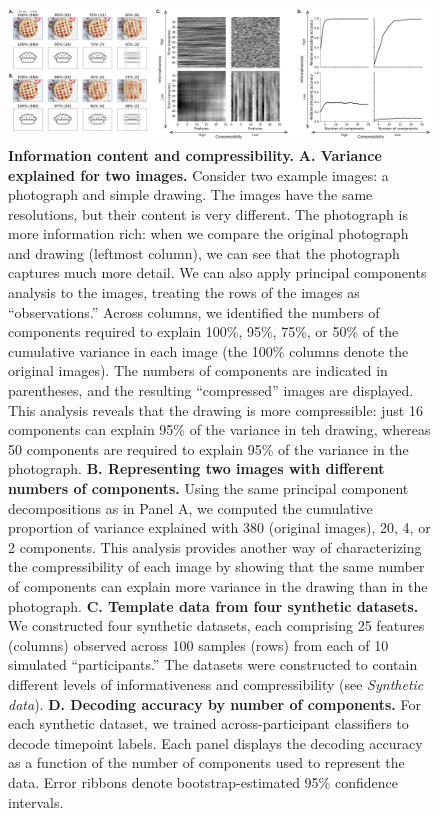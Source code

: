 \documentclass[english, 11pt]{article}
\begin{document}
\begin{figure}[tp]

  \centering
  \includegraphics[width=\textwidth]{figs/information_and_compressibility}
  
  \caption{\textbf{Information content and compressibility.} \textbf{A.
  Variance explained for two images.} Consider two example images: a photograph
  and simple drawing. The images have the same resolutions, but their content
  is very different. The photograph is more information rich: when we compare
  the original photograph and drawing (leftmost column), we can see that the
  photograph captures much more detail. We can also apply principal components
  analysis to the images, treating the rows of the images as ``observations.''
  Across columns, we identified the numbers of components required to explain
  100\%, 95\%, 75\%, or 50\% of the cumulative variance in each image (the
  100\% columns denote the original images). The numbers of components are
  indicated in parentheses, and the resulting ``compressed'' images are
  displayed. This analysis reveals that the drawing is more compressible: just
  16 components can explain 95\% of the variance in teh drawing, whereas 50
  components are required to explain 95\% of the variance in the photograph.
  \textbf{B. Representing two images with different numbers of components.}
  Using the same principal component decompositions as in Panel A, we computed
  the cumulative proportion of variance explained with 380 (original images),
  20, 4, or 2 components. This analysis provides another way of characterizing
  the compressibility of each image by showing that the same number of
  components can explain more variance in the drawing than in the photograph.
  \textbf{C. Template data from four synthetic datasets.} We constructed four
  synthetic datasets, each comprising 25 features (columns) observed across 100
  samples (rows) from each of 10 simulated ``participants.'' The datasets were
  constructed to contain different levels of informativeness and
  compressibility (see \textit{Synthetic data}). \textbf{D. Decoding accuracy
  by number of components.} For each synthetic dataset, we trained
  across-participant classifiers to decode timepoint labels.  Each panel displays the
  decoding accuracy as a function of the number of components used to represent
  the data. Error ribbons denote bootstrap-estimated 95\% confidence intervals.}
\label{fig:information-compression} 
\end{figure}
\end{document}
